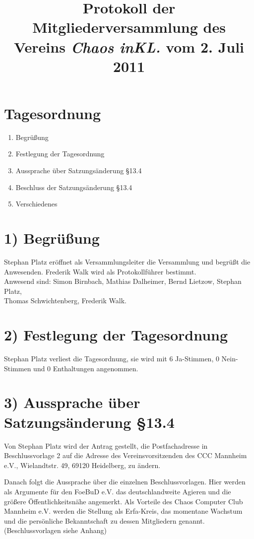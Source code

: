 \documentclass{scrartcl}
\title{Protokoll der Mitgliederversammlung des Vereins \emph{Chaos inKL.} vom 2. Juli 2011}
\begin{document}
 
\maketitle

\section*{Tagesordnung}

\begin{enumerate}
  \setlength{\itemsep}{1pt}
  \item Begrüßung
  \item Festlegung der Tagesordnung
  \item Aussprache über Satzungsänderung \S13.4
  \item Beschluss der Satzungsänderung \S13.4
  \item Verschiedenes
\end{enumerate}

\section*{1) Begrüßung}

    Stephan Platz eröffnet als Versammlungsleiter die Versammlung und begrüßt die Anwesenden.
    Frederik Walk wird als Protokollführer bestimmt.\\
    Anwesend sind: Simon Birnbach, Mathias Dalheimer, Bernd Lietzow, Stephan Platz,\\
    Thomas Schwichtenberg, Frederik Walk.

\section*{2) Festlegung der Tagesordnung}
    
    Stephan Platz verliest die Tagesordnung, sie wird mit 6 Ja-Stimmen, 0 Nein-Stimmen und 0 Enthaltungen angenommen.

\section*{3) Aussprache über Satzungsänderung \S13.4}


    Von Stephan Platz wird der Antrag gestellt, die Postfachadresse in Beschlussvorlage 2 auf die Adresse des Vereinsvorsitzenden des CCC Mannheim e.V., Wielandtstr. 49, 69120 Heidelberg, zu ändern.

    Danach folgt die Aussprache über die einzelnen Beschlussvorlagen. Hier werden als Argumente für den FoeBuD e.V. das deutschlandweite Agieren und die größere Öffentlichkeitsnähe angemerkt. Als Vorteile des Chaos Computer Club Mannheim e.V. werden die Stellung als Erfa-Kreis, das momentane Wachstum und die persönliche Bekanntschaft zu dessen Mitgliedern genannt. (Beschlussvorlagen siehe Anhang)
    
\end{document}

